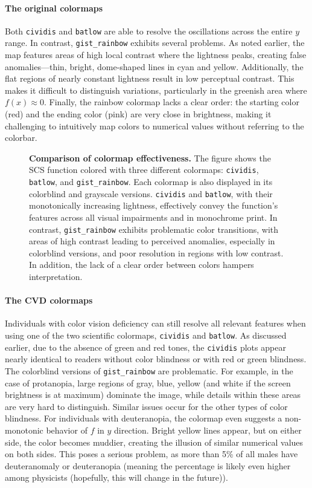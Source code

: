 \paragraph{The original colormaps}
Both \verb|cividis| and \verb|batlow| are able to resolve the oscillations across the entire $y$ range. In contrast, \verb|gist_rainbow| exhibits several problems. As noted earlier, the map features areas of high local contrast where the lightness peaks, creating false anomalies---thin, bright, dome-shaped lines in cyan and yellow. Additionally, the flat regions of nearly constant lightness result in low perceptual contrast. This makes it difficult to distinguish variations, particularly in the greenish area where $f(x) \approx 0$. Finally, the rainbow colormap lacks a clear order: the starting color (red) and the ending color (pink) are very close in brightness, making it challenging to intuitively map colors to numerical values without referring to the colorbar.

\begin{figure}
	\centering
	
	\caption{\textbf{Comparison of colormap effectiveness.} The figure shows the SCS function colored with three different colormaps: \texttt{cividis}, \texttt{batlow}, and \texttt{gist\_rainbow}. Each colormap is also displayed in its colorblind and grayscale versions. \texttt{cividis} and \texttt{batlow}, with their monotonically increasing lightness, effectively convey the function's features across all visual impairments and in monochrome print. In contrast, \texttt{gist\_rainbow} exhibits problematic color transitions, with areas of high contrast leading to perceived anomalies, especially in colorblind versions, and poor resolution in regions with low contrast. In addition, the lack of a clear order between colors hampers interpretation.}
	\label{fig:sensitivityCVD}
\end{figure}

\paragraph{The CVD colormaps} 
Individuals with color vision deficiency can still resolve all relevant features when using one of the two scientific colormaps,  \verb|cividis| and \verb|batlow|. As discussed earlier, due to the absence of green and red tones, the \verb|cividis| plots appear nearly identical to readers without color blindness or with red or green blindness. The colorblind versions of \verb|gist_rainbow| are problematic. For example, in the case of protanopia, large regions of gray, blue, yellow (and white if the screen brightness is at maximum) dominate the image, while details within these areas are very hard to distinguish. Similar issues occur for the other types of color blindness. For individuals with deuteranopia, the colormap even suggests a non-monotonic behavior of $f$ in $y$ direction. Bright yellow lines appear, but on either side, the color becomes muddier, creating the illusion of similar numerical values on both sides.
This poses a serious problem, as more than 5\% of all males have deuteranomaly or deuteranopia (meaning the percentage is likely even higher among physicists (hopefully, this will change in the future)).

